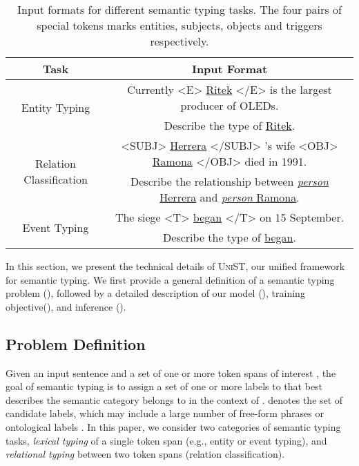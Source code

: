 \documentclass[11pt]{article}
\newcommand{\model}{\textsc{UniST}\xspace}
\begin{document}
\begin{table*}[t]
    \centering
    \small
\begin{tabular}{c|c}
        \toprule
        Task & Input Format \\ \midrule
        \multirow{2}{*}{Entity Typing} & Currently <E> \underline{Ritek} </E> is the largest producer of OLEDs. \\ & Describe the type of \underline{Ritek}.\\
        \midrule
        \multirow{2}{*}{Relation Classification} & <SUBJ> \underline{Herrera} </SUBJ> 's wife <OBJ> \underline{Ramona} </OBJ> died in 1991. \\ & Describe the relationship between \underline{\textit{person} Herrera} and \underline{\textit{person} Ramona}.\\
        \midrule
        \multirow{2}{*}{Event Typing} & The siege <T> \underline{began} </T> on 15 September. \\ & Describe the type of \underline{began}.\\ 
        \bottomrule
    \end{tabular}
\caption{Input formats for different semantic typing tasks. The four pairs of special tokens marks entities, subjects, objects and triggers respectively.}
    \label{tab:input}
\end{table*} 
In this section, we present the technical details of \model, our unified framework for semantic typing. We first provide a general definition of a semantic typing problem (), followed by a detailed description of our model  (), training objective(), and inference ().

\subsection{Problem Definition} \label{probdef}
Given an input sentence  and a set of one or more token spans of interest , the goal of semantic typing is to assign a set of one or more labels  to  that best describes the semantic category  belongs to in the context of .  denotes the set of candidate labels, which may include a large number of free-form phrases \cite{choi-etal-2018-ultra} or ontological labels \cite{zhang-etal-2017-position}. In this paper, we consider two categories of semantic typing tasks, \emph{lexical typing} of a single token span (e.g., entity or event typing), and \emph{relational typing} between two token spans (relation classification).
\end{document}
